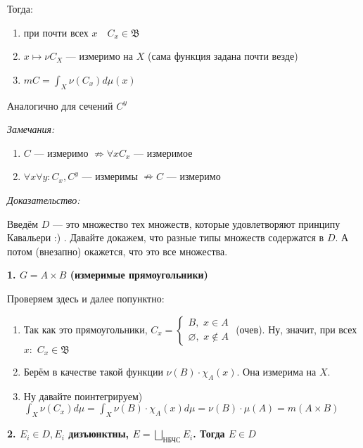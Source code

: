 \documentclass{article}
\def\dbl{\,\,}
\begin{document}
Тогда: 

\begin{enumerate}
    \item при почти всех $x \quad C_{x} \in \mathfrak{B}$ 
    \item $x \mapsto \nu C_{X}$ --- измеримо на $X$ (сама функция задана почти везде)
    \item $m C = \int_{X} \nu (C_{x}) d\mu(x)$
\end{enumerate}

Аналогично для сечений $C^{y}$

\textit{Замечания:}
\begin{enumerate}
    \item $C$ --- измеримо $\nRightarrow \forall x C_x$ --- измеримое 
    \item $\forall x \forall y: C_x, C^y$ --- измеримы $\nRightarrow C$ --- измеримо
\end{enumerate}

\textit{Доказательство:}

Введём $D$ --- это множество тех множеств, которые удовлетворяют принципу Кавальери :) . Давайте докажем, что разные типы множеств содержатся в $D$. А потом (внезапно) окажется, что это все множества.

\textbf{1. $G = A \times B$ (измеримые прямоугольники)}

Проверяем здесь и далее попунктно:

\begin{enumerate}
    \item Так как это прямоугольники, $C_x = \begin{cases}
        B, \dbl x \in A\\
        \varnothing, \dbl x \notin A
        \end{cases}$ (очев). Ну, значит, при всех $x: \dbl C_x \in \mathfrak{B}$
    \item Берём в качестве такой функции $\nu(B) \cdot \chi_A(x)$. Она измерима на $X$.
    \item Ну давайте поинтегрируем) $\int_{X} \nu(C_x) d\mu = \int_{X} \nu(B) \cdot \chi_A(x) d\mu = \nu(B) \cdot \mu(A) = m(A \times B)$
\end{enumerate}

\textbf{2. $E_i \in D, E_i$ дизъюнктны, $E = \bigsqcup_{\text{НБЧС}} E_i$. Тогда $E \in D$}
\end{document}
